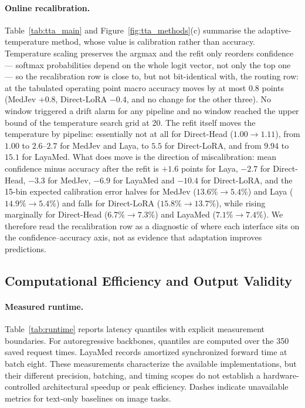 \paragraph{Online recalibration.}
Table~\ref{tab:tta_main} and Figure~\ref{fig:tta_methods}(c) summarise the adaptive-temperature method, whose value is calibration rather than accuracy. Temperature scaling preserves the argmax and the refit only reorders confidence --- softmax probabilities depend on the whole logit vector, not only the top one --- so the recalibration row is close to, but not bit-identical with, the routing row: at the tabulated operating point macro accuracy moves by at most $0.8$ points (MedJev $+0.8$, Direct-LoRA $-0.4$, and no change for the other three). No window triggered a drift alarm for any pipeline and no window reached the upper bound of the temperature search grid at 20. The refit itself moves the temperature by pipeline: essentially not at all for Direct-Head ($1.00\rightarrow1.11$), from $1.00$ to $2.6$--$2.7$ for MedJev and Laya, to $5.5$ for Direct-LoRA, and from $9.94$ to $15.1$ for LayaMed. What does move is the direction of miscalibration: mean confidence minus accuracy after the refit is $+1.6$ points for Laya, $-2.7$ for Direct-Head, $-3.3$ for MedJev, $-6.9$ for LayaMed and $-10.4$ for Direct-LoRA, and the 15-bin expected calibration error halves for MedJev ($13.6\%\rightarrow5.4\%$) and Laya ($14.9\%\rightarrow5.4\%$) and falls for Direct-LoRA ($15.8\%\rightarrow13.7\%$), while rising marginally for Direct-Head ($6.7\%\rightarrow7.3\%$) and LayaMed ($7.1\%\rightarrow7.4\%$). We therefore read the recalibration row as a diagnostic of where each interface sits on the confidence--accuracy axis, not as evidence that adaptation improves predictions.

\subsection{Computational Efficiency and Output Validity}
\paragraph{Measured runtime.}
Table~\ref{tab:runtime} reports latency quantiles with explicit measurement boundaries. For autoregressive backbones, quantiles are computed over the 350 saved request times. LayaMed records amortized synchronized forward time at batch eight. These measurements characterize the available implementations, but their different precision, batching, and timing scopes do not establish a hardware-controlled architectural speedup or peak efficiency. Dashes indicate unavailable metrics for text-only baselines on image tasks.


